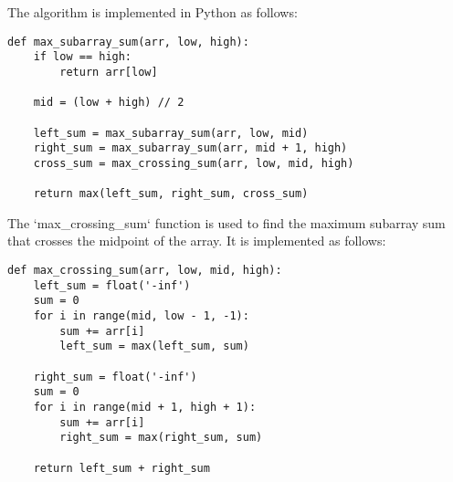 \documentclass{article}
\begin{document}
The algorithm is implemented in Python as follows:
\begin{verbatim}
def max_subarray_sum(arr, low, high):
    if low == high:
        return arr[low]
    
    mid = (low + high) // 2
    
    left_sum = max_subarray_sum(arr, low, mid)
    right_sum = max_subarray_sum(arr, mid + 1, high)
    cross_sum = max_crossing_sum(arr, low, mid, high)
    
    return max(left_sum, right_sum, cross_sum)
\end{verbatim}
The `max\_crossing\_sum` function is used to find the maximum subarray sum that crosses the midpoint of the array. It is implemented as follows:
\begin{verbatim}
def max_crossing_sum(arr, low, mid, high):
    left_sum = float('-inf')
    sum = 0
    for i in range(mid, low - 1, -1):
        sum += arr[i]
        left_sum = max(left_sum, sum)
    
    right_sum = float('-inf')
    sum = 0
    for i in range(mid + 1, high + 1):
        sum += arr[i]
        right_sum = max(right_sum, sum)
    
    return left_sum + right_sum
\end{verbatim}
\end{document}
